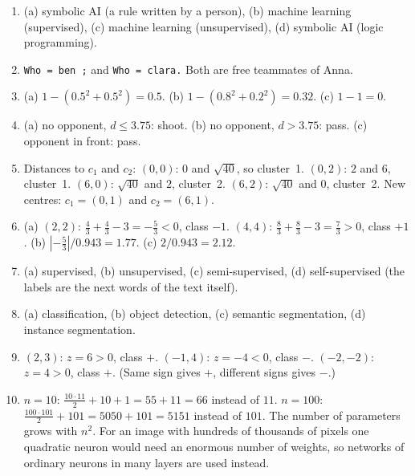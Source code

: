 \begin{enumerate}[label=\textbf{\ansnum.\arabic*}]
  \item (a) symbolic AI (a rule written by a person), (b) machine learning (supervised), (c) machine learning (unsupervised), (d) symbolic AI (logic programming).
  \item \texttt{Who = ben ;} and \texttt{Who = clara.} Both are free teammates of Anna.
  \item (a) $1-(0.5^2+0.5^2)=0.5$. (b) $1-(0.8^2+0.2^2)=0.32$. (c) $1-1=0$.
  \item (a) no opponent, $d\le3.75$: shoot. (b) no opponent, $d>3.75$: pass. (c) opponent in front: pass.
  \item Distances to $c_1$ and $c_2$: $(0,0)$: $0$ and $\sqrt{40}$, so cluster~1. $(0,2)$: $2$ and $6$, cluster~1. $(6,0)$: $\sqrt{40}$ and $2$, cluster~2. $(6,2)$: $\sqrt{40}$ and $0$, cluster~2. New centres: $c_1=(0,1)$ and $c_2=(6,1)$.
  \item (a) $(2,2)$: $\frac43+\frac43-3=-\frac53<0$, class $-1$. $(4,4)$: $\frac83+\frac83-3=\frac73>0$, class $+1$. (b) $|{-\frac53}|/0.943=1.77$. (c) $2/0.943=2.12$.
  \item (a) supervised, (b) unsupervised, (c) semi-supervised, (d) self-supervised (the labels are the next words of the text itself).
  \item (a) classification, (b) object detection, (c) semantic segmentation, (d) instance segmentation.
  \item $(2,3)$: $z=6>0$, class $+$. $(-1,4)$: $z=-4<0$, class $-$. $(-2,-2)$: $z=4>0$, class $+$. (Same sign gives $+$, different signs gives $-$.)
  \item[\textbf{\ansnum.10}] $n=10$: $\frac{10\cdot11}{2}+10+1=55+11=66$ instead of $11$. $n=100$: $\frac{100\cdot101}{2}+101=5050+101=5151$ instead of $101$. The number of parameters grows with $n^2$. For an image with hundreds of thousands of pixels one quadratic neuron would need an enormous number of weights, so networks of ordinary neurons in many layers are used instead.
\end{enumerate}
